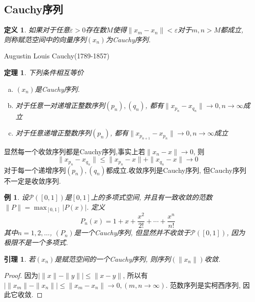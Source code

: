 \documentclass{book}
\newtheorem{definition}{\hspace{2em}定义}[section]
\newtheorem{theorem}{\hspace{2em}定理}[section]
\newtheorem{lemma}{\hspace{2em}引理}[section]
\newtheorem{proof}{证明}[section]
\newtheorem{example}{例}[section]
\begin{document}
\subsection*{Cauchy序列}
\begin{definition}
  如果对于任意$\varepsilon>0$存在数$M$使得$\|x_m-x_n\|<\varepsilon$对于$m,n>M$都成立, 则称赋范空间中的向量序列$(x_n)$为Cauchy序列.
\end{definition}
Augustin Louis Cauchy(1789-1857)
\begin{theorem}
  下列条件相互等价
  \begin{enumerate}[(a)]
    \item $(x_n)$是Cauchy序列.
    \item 对于任意一对递增正整数序列$(p_n),(q_n)$, 都有$\|x_{p_n}-x_{q_n}\|\to0,n\to\infty$成立
    \item 对于任意递增正整数序列$(p_n)$, 都有$\|x_{p_{n+1}}-x_{p_n}\|\to0,n\to\infty$成立
  \end{enumerate}
\end{theorem}
显然每一个收敛序列都是Cauchy序列,事实上若$\|x_n-x\|\to0$, 则
\begin{equation*}
  \|x_{p_n}-x_{q_n}\|\leq\|x_{p_n}-x\|+\|x_{q_n}-x\|\to0
\end{equation*}
对于每一个递增序列$(p_n),(q_n)$都成立.收敛序列是Cauchy序列, 但Cauchy序列不一定是收敛序列.
\begin{example}
  设$\mathcal{P}([0,1])$是$[0,1]$上的多项式空间, 并且有一致收敛的范数$\|P\|=\max_{[0,1]}|P(x)|$. 定义
  \begin{equation*}
    P_n(x)=1+x+\frac{x^2}{2!}+\cdots+\frac{x^n}{n!}
  \end{equation*}
  其中$n=1,2,\dots$, $(P_n)$是一个Cauchy序列, 但显然并不收敛于$\mathcal{P}([0,1])$, 因为极限不是一个多项式.
\end{example}
\begin{lemma}
  若$(x_n)$是赋范空间的一个Cauchy序列, 则序列$(\|x_n\|)$收敛.
\end{lemma}
\begin{proof}
  因为$|\|x\|-\|y\||\leq\|x-y\|$, 所以有$|\|x_m\|-\|x_n\||\leq\|x_m-x_n\|\to0,(m,n\to \infty)$. 范数序列是实柯西序列, 因此它收敛.
\end{proof}
\end{document}

